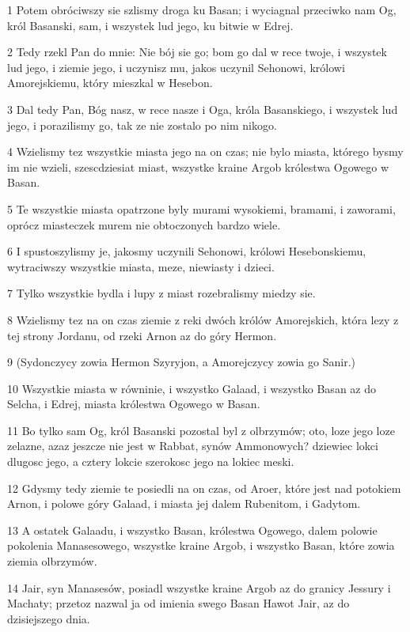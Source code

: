 \par 1 Potem obróciwszy sie szlismy droga ku Basan; i wyciagnal przeciwko nam Og, król Basanski, sam, i wszystek lud jego, ku bitwie w Edrej.
\par 2 Tedy rzekl Pan do mnie: Nie bój sie go; bom go dal w rece twoje, i wszystek lud jego, i ziemie jego, i uczynisz mu, jakos uczynil Sehonowi, królowi Amorejskiemu, który mieszkal w Hesebon.
\par 3 Dal tedy Pan, Bóg nasz, w rece nasze i Oga, króla Basanskiego, i wszystek lud jego, i porazilismy go, tak ze nie zostalo po nim nikogo.
\par 4 Wzielismy tez wszystkie miasta jego na on czas; nie bylo miasta, którego bysmy im nie wzieli, szescdziesiat miast, wszystke kraine Argob królestwa Ogowego w Basan.
\par 5 Te wszystkie miasta opatrzone byly murami wysokiemi, bramami, i zaworami, oprócz miasteczek murem nie obtoczonych bardzo wiele.
\par 6 I spustoszylismy je, jakosmy uczynili Sehonowi, królowi Hesebonskiemu, wytraciwszy wszystkie miasta, meze, niewiasty i dzieci.
\par 7 Tylko wszystkie bydla i lupy z miast rozebralismy miedzy sie.
\par 8 Wzielismy tez na on czas ziemie z reki dwóch królów Amorejskich, która lezy z tej strony Jordanu, od rzeki Arnon az do góry Hermon.
\par 9 (Sydonczycy zowia Hermon Szyryjon, a Amorejczycy zowia go Sanir.)
\par 10 Wszystkie miasta w równinie, i wszystko Galaad, i wszystko Basan az do Selcha, i Edrej, miasta królestwa Ogowego w Basan.
\par 11 Bo tylko sam Og, król Basanski pozostal byl z olbrzymów; oto, loze jego loze zelazne, azaz jeszcze nie jest w Rabbat, synów Ammonowych? dziewiec lokci dlugosc jego, a cztery lokcie szerokosc jego na lokiec meski.
\par 12 Gdysmy tedy ziemie te posiedli na on czas, od Aroer, które jest nad potokiem Arnon, i polowe góry Galaad, i miasta jej dalem Rubenitom, i Gadytom.
\par 13 A ostatek Galaadu, i wszystko Basan, królestwa Ogowego, dalem polowie pokolenia Manasesowego, wszystke kraine Argob, i wszystko Basan, które zowia ziemia olbrzymów.
\par 14 Jair, syn Manasesów, posiadl wszystke kraine Argob az do granicy Jessury i Machaty; przetoz nazwal ja od imienia swego Basan Hawot Jair, az do dzisiejszego dnia.
